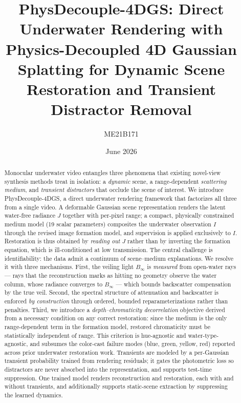 \documentclass[11pt,a4paper]{article}
\title{\textbf{PhysDecouple-4DGS: Direct Underwater Rendering with Physics-Decoupled 4D Gaussian Splatting for Dynamic Scene Restoration and Transient Distractor Removal}}
\author{ME21B171}
\date{June 2026}
\newcommand{\Binf}{B_\infty}
\newcommand{\J}{J}
\newcommand{\I}{I}
\begin{document}
\maketitle

\begin{abstract}
Monocular underwater video entangles three phenomena that existing novel-view synthesis methods treat in isolation: a \emph{dynamic} scene, a range-dependent \emph{scattering medium}, and \emph{transient distractors} that occlude the scene of interest. We introduce PhysDecouple-4DGS, a direct underwater rendering framework that factorizes all three from a single video. A deformable Gaussian scene representation renders the latent water-free radiance $\J$ together with per-pixel range; a compact, physically constrained medium model (19 scalar parameters) composites the underwater observation $\I$ through the revised image formation model, and supervision is applied exclusively to $\I$. Restoration is thus obtained by \emph{reading out} $\J$ rather than by inverting the formation equation, which is ill-conditioned at low transmission. The central challenge is identifiability: the data admit a continuum of scene--medium explanations. We resolve it with three mechanisms. First, the veiling light $\Binf$ is \emph{measured} from open-water rays --- rays that the reconstruction marks as hitting no geometry observe the water column, whose radiance converges to $\Binf$ --- which bounds backscatter compensation by the true veil. Second, the spectral structure of attenuation and backscatter is enforced \emph{by construction} through ordered, bounded reparameterizations rather than penalties. Third, we introduce a \emph{depth--chromaticity decorrelation} objective derived from a necessary condition on any correct restoration: since the medium is the only range-dependent term in the formation model, restored chromaticity must be statistically independent of range. This criterion is hue-agnostic and water-type-agnostic, and subsumes the color-cast failure modes (blue, green, yellow, red) reported across prior underwater restoration work. Transients are modeled by a per-Gaussian transient probability trained from rendering residuals; it gates the photometric loss so distractors are never absorbed into the representation, and supports test-time suppression. One trained model renders reconstruction and restoration, each with and without transients, and additionally supports static-scene extraction by suppressing the learned dynamics.
\end{abstract}
\end{document}
